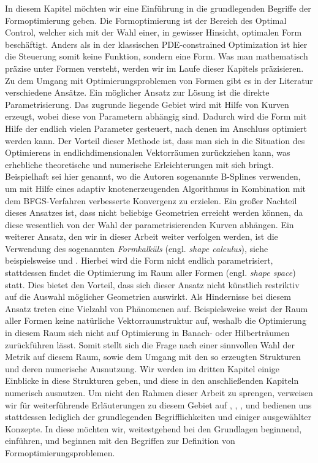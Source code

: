 In diesem Kapitel möchten wir eine Einführung in die grundlegenden Begriffe der Formoptimierung geben.
Die Formoptimierung ist der Bereich des Optimal Control, welcher sich mit der Wahl einer, in gewisser Hinsicht, optimalen Form beschäftigt. Anders als in der klassischen PDE-constrained Optimization ist hier die Steuerung somit keine Funktion, sondern eine Form. Was man mathematisch präzise unter Formen versteht, werden wir im Laufe dieser Kapitels präzisieren.
Zu dem Umgang mit Optimierungsproblemen von Formen gibt es in der Literatur verschiedene Ansätze. \newline
Ein möglicher Ansatz zur Lösung ist die direkte Parametrisierung. Das zugrunde liegende Gebiet wird mit Hilfe von Kurven erzeugt, wobei diese von Parametern abhängig sind. Dadurch wird die Form mit Hilfe der endlich vielen Parameter gesteuert, nach denen im Anschluss optimiert werden kann. Der Vorteil dieser Methode ist, dass man sich in die Situation des Optimierens in endlichdimensionalen Vektorräumen zurückziehen kann, was erhebliche theoretische und numerische Erleichterungen mit sich bringt. Beispielhaft sei hier \cite{b-spline} genannt, wo die Autoren sogenannte B-Splines verwenden, um mit Hilfe eines adaptiv knotenerzeugenden Algorithmus in Kombination mit dem BFGS-Verfahren verbesserte Konvergenz zu erzielen. Ein großer Nachteil dieses Ansatzes ist, dass nicht beliebige Geometrien erreicht werden können, da diese wesentlich von der Wahl der parametrisierenden Kurven abhängen. \newline
Ein weiterer Ansatz, den wir in dieser Arbeit weiter verfolgen werden, ist die Verwendung des sogenannten \textit{Formkalküls} (engl. \textit{shape calculus}), siehe beispielsweise \cite{Shape_diff} und \cite{shapeopt}. Hierbei wird die Form nicht endlich parametrisiert, stattdessen findet die Optimierung im Raum aller Formen (engl. \textit{shape space}) statt. Dies bietet den Vorteil, dass sich dieser Ansatz nicht künstlich restriktiv auf die Auswahl möglicher Geometrien auswirkt. Als Hindernisse bei diesem Ansatz treten eine Vielzahl von Phänomenen auf. Beispielsweise weist der Raum aller Formen keine natürliche Vektorraumstruktur auf, weshalb die Optimierung in diesem Raum sich nicht auf Optimierung in Banach- oder Hilberträumen zurückführen lässt. Somit stellt sich die Frage nach einer sinnvollen Wahl der Metrik auf diesem Raum, sowie dem Umgang mit den so erzeugten Strukturen und deren numerische Ausnutzung. Wir werden im dritten Kapitel einige Einblicke in diese Strukturen geben, und diese in den anschließenden Kapiteln numerisch ausnutzen.
Um nicht den Rahmen dieser Arbeit zu sprengen, verweisen wir für weiterführende Erläuterungen zu diesem Gebiet auf \cite{riemann}, \cite{riemann2},  \cite{shape_space}, und bedienen uns stattdessen lediglich der grundlegenden Begrifflichkeiten und einiger ausgewählter Konzepte. In diese möchten wir, weitestgehend bei den Grundlagen beginnend, einführen, und beginnen mit den Begriffen zur Definition von Formoptimierungsproblemen.

